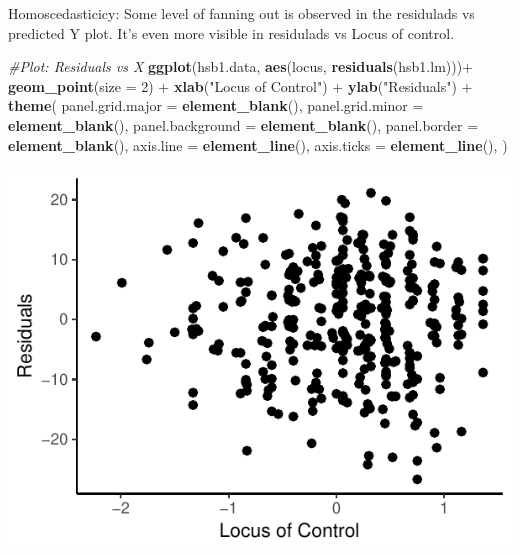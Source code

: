 \documentclass[]{article}
\newenvironment{Shaded}{\begin{snugshade}}{\end{snugshade}}
\newcommand{\KeywordTok}[1]{\textcolor[rgb]{0.13,0.29,0.53}{\textbf{{#1}}}}
\newcommand{\DataTypeTok}[1]{\textcolor[rgb]{0.13,0.29,0.53}{{#1}}}
\newcommand{\DecValTok}[1]{\textcolor[rgb]{0.00,0.00,0.81}{{#1}}}
\newcommand{\StringTok}[1]{\textcolor[rgb]{0.31,0.60,0.02}{{#1}}}
\newcommand{\CommentTok}[1]{\textcolor[rgb]{0.56,0.35,0.01}{\textit{{#1}}}}
\newcommand{\NormalTok}[1]{{#1}}
\begin{document}
Homoscedasticicy: Some level of fanning out is observed in the
residulads vs predicted Y plot. It's even more visible in residulads vs
Locus of control.

\begin{Shaded}
\begin{Highlighting}[]
\CommentTok{#Plot: Residuals vs X}
\KeywordTok{ggplot}\NormalTok{(hsb1.data, }\KeywordTok{aes}\NormalTok{(locus, }\KeywordTok{residuals}\NormalTok{(hsb1.lm)))+}\StringTok{ }\KeywordTok{geom_point}\NormalTok{(}\DataTypeTok{size =} \DecValTok{2}\NormalTok{) +}\StringTok{ }\KeywordTok{xlab}\NormalTok{(}\StringTok{"Locus of Control"}\NormalTok{) +}\StringTok{ }\KeywordTok{ylab}\NormalTok{(}\StringTok{"Residuals"}\NormalTok{) +}
\StringTok{   }\KeywordTok{theme}\NormalTok{(}
        \DataTypeTok{panel.grid.major =} \KeywordTok{element_blank}\NormalTok{(),}
        \DataTypeTok{panel.grid.minor =} \KeywordTok{element_blank}\NormalTok{(),}
        \DataTypeTok{panel.background =} \KeywordTok{element_blank}\NormalTok{(),}
        \DataTypeTok{panel.border =} \KeywordTok{element_blank}\NormalTok{(),}
        \DataTypeTok{axis.line =} \KeywordTok{element_line}\NormalTok{(),}
        \DataTypeTok{axis.ticks =} \KeywordTok{element_line}\NormalTok{(),}
     \NormalTok{)}
\end{Highlighting}
\end{Shaded}

\includegraphics{Homework_3_Revised_Minoo_files/figure-latex/unnamed-chunk-4-1.pdf}
\end{document}
